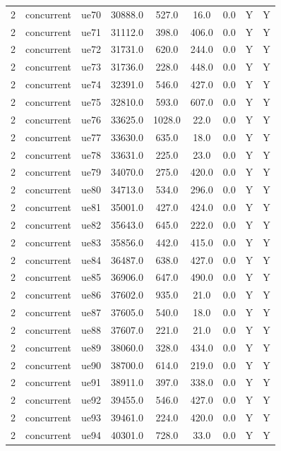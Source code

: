 \begin{table}[ht]
\begin{tabular}{|c|c|c|c|c|c|c|c|c|}
2 & concurrent & ue70 & 30888.0 & 527.0 & 16.0 & 0.0 & Y & Y \\
2 & concurrent & ue71 & 31112.0 & 398.0 & 406.0 & 0.0 & Y & Y \\
2 & concurrent & ue72 & 31731.0 & 620.0 & 244.0 & 0.0 & Y & Y \\
2 & concurrent & ue73 & 31736.0 & 228.0 & 448.0 & 0.0 & Y & Y \\
2 & concurrent & ue74 & 32391.0 & 546.0 & 427.0 & 0.0 & Y & Y \\
2 & concurrent & ue75 & 32810.0 & 593.0 & 607.0 & 0.0 & Y & Y \\
2 & concurrent & ue76 & 33625.0 & 1028.0 & 22.0 & 0.0 & Y & Y \\
2 & concurrent & ue77 & 33630.0 & 635.0 & 18.0 & 0.0 & Y & Y \\
2 & concurrent & ue78 & 33631.0 & 225.0 & 23.0 & 0.0 & Y & Y \\
2 & concurrent & ue79 & 34070.0 & 275.0 & 420.0 & 0.0 & Y & Y \\
2 & concurrent & ue80 & 34713.0 & 534.0 & 296.0 & 0.0 & Y & Y \\
2 & concurrent & ue81 & 35001.0 & 427.0 & 424.0 & 0.0 & Y & Y \\
2 & concurrent & ue82 & 35643.0 & 645.0 & 222.0 & 0.0 & Y & Y \\
2 & concurrent & ue83 & 35856.0 & 442.0 & 415.0 & 0.0 & Y & Y \\
2 & concurrent & ue84 & 36487.0 & 638.0 & 427.0 & 0.0 & Y & Y \\
2 & concurrent & ue85 & 36906.0 & 647.0 & 490.0 & 0.0 & Y & Y \\
2 & concurrent & ue86 & 37602.0 & 935.0 & 21.0 & 0.0 & Y & Y \\
2 & concurrent & ue87 & 37605.0 & 540.0 & 18.0 & 0.0 & Y & Y \\
2 & concurrent & ue88 & 37607.0 & 221.0 & 21.0 & 0.0 & Y & Y \\
2 & concurrent & ue89 & 38060.0 & 328.0 & 434.0 & 0.0 & Y & Y \\
2 & concurrent & ue90 & 38700.0 & 614.0 & 219.0 & 0.0 & Y & Y \\
2 & concurrent & ue91 & 38911.0 & 397.0 & 338.0 & 0.0 & Y & Y \\
2 & concurrent & ue92 & 39455.0 & 546.0 & 427.0 & 0.0 & Y & Y \\
2 & concurrent & ue93 & 39461.0 & 224.0 & 420.0 & 0.0 & Y & Y \\
2 & concurrent & ue94 & 40301.0 & 728.0 & 33.0 & 0.0 & Y & Y \\

\end{tabular}
\end{table}
